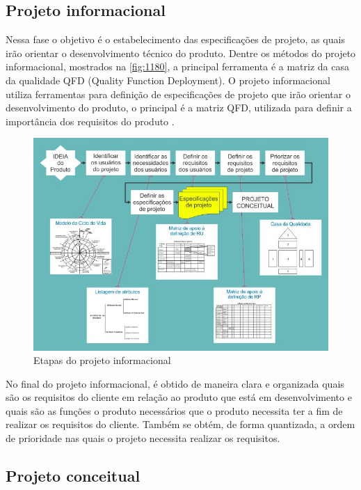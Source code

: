 \subsection{Projeto informacional}

Nessa fase o objetivo é o estabelecimento das especificações de projeto, as quais irão orientar o desenvolvimento técnico do produto.
Dentre os métodos do projeto informacional, mostrados na \autoref{fig:1180}, a principal ferramenta é a matriz da casa da qualidade QFD (Quality Function Deployment).
O projeto informacional utiliza ferramentas para definição de especificações de projeto que irão orientar o desenvolvimento do produto, o principal é a matriz QFD,
utilizada para definir a importância dos requisitos do produto \autocite{PRODIP}.

\begin{figure}[htb]
	\caption{\label{fig:1180}Etapas do projeto informacional}
	\begin{center}
		\includegraphics[width=\textwidth]{pictures/1180.jpg}
	\end{center}
\end{figure}

No final do projeto informacional, é obtido de maneira clara e organizada quais são os requisitos do cliente em relação ao produto que está em desenvolvimento e quais são as
funções o produto necessários que o produto necessita ter a fim de realizar os requisitos do cliente.
Também se obtém, de forma quantizada, a ordem de prioridade nas quais o projeto necessita realizar os requisitos.

\subsection{Projeto conceitual}

